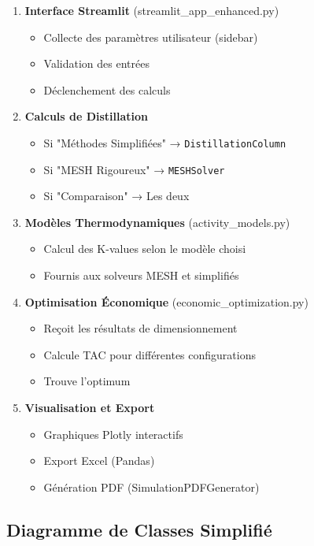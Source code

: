 \documentclass[11pt,a4paper]{article}
\begin{document}
\begin{enumerate}
\item \textbf{Interface Streamlit} (streamlit\_app\_enhanced.py)
\begin{itemize}
\item Collecte des paramètres utilisateur (sidebar)
\item Validation des entrées
\item Déclenchement des calculs
\end{itemize}

\item \textbf{Calculs de Distillation}
\begin{itemize}
\item Si "Méthodes Simplifiées" → \texttt{DistillationColumn}
\item Si "MESH Rigoureux" → \texttt{MESHSolver}
\item Si "Comparaison" → Les deux
\end{itemize}

\item \textbf{Modèles Thermodynamiques} (activity\_models.py)
\begin{itemize}
\item Calcul des K-values selon le modèle choisi
\item Fournis aux solveurs MESH et simplifiés
\end{itemize}

\item \textbf{Optimisation Économique} (economic\_optimization.py)
\begin{itemize}
\item Reçoit les résultats de dimensionnement
\item Calcule TAC pour différentes configurations
\item Trouve l'optimum
\end{itemize}

\item \textbf{Visualisation et Export}
\begin{itemize}
\item Graphiques Plotly interactifs
\item Export Excel (Pandas)
\item Génération PDF (SimulationPDFGenerator)
\end{itemize}
\end{enumerate}

\subsection{Diagramme de Classes Simplifié}
\end{document}
